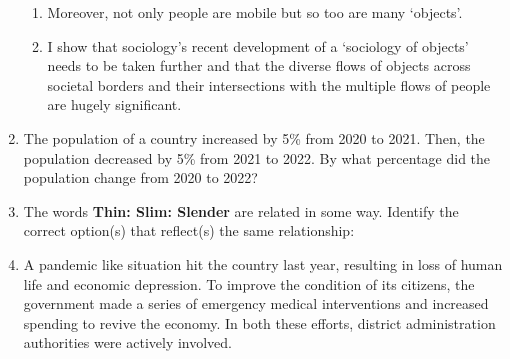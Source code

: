 \documentclass[12pt]{article}
\theoremstyle{remark}
\begin{document}
\begin{enumerate}
\begin{enumerate}
\item  Moreover, not only people are mobile but so too are many ‘objects’.
\item  I show that sociology’s recent development of a ‘sociology of objects’ needs to be taken further and that the diverse flows of objects across societal borders and their intersections with the multiple flows of people are hugely significant. 
\end{enumerate}
\begin{enumerate}  \end{enumerate}
\hfill{}
\item The population of a country increased by 5\% from 2020 to 2021. Then, the population decreased by 5\% from 2021 to 2022. By what percentage did the population change from 2020 to 2022? 
\begin{enumerate}  \end{enumerate}
\hfill{}
\item The words \textbf{Thin: Slim: Slender} are related in some way. Identify the correct option(s) that reflect(s) the same relationship: 
\begin{enumerate}  \end{enumerate}
\hfill{}
\item  A pandemic like situation hit the country last year, resulting in loss of human life and economic depression. To improve the condition of its citizens, the government made a series of emergency medical interventions and increased spending to revive the economy. In both these efforts, district administration authorities were actively involved.

\end{enumerate}
\end{document}
